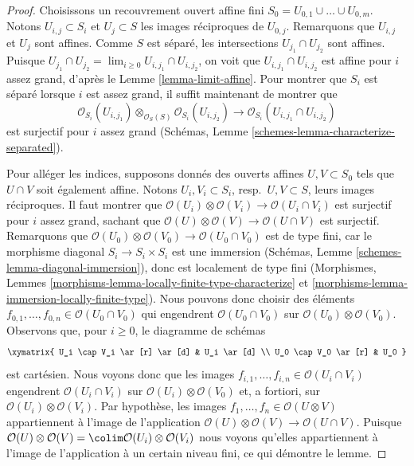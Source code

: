 \begin{proof}
Choisissons un recouvrement ouvert affine fini
$S_0 = U_{0, 1} \cup \ldots \cup U_{0, m}$. Notons
$U_{i, j} \subset S_i$ et $U_j \subset S$ les images réciproques de
$U_{0, j}$. Remarquons que $U_{i, j}$ et $U_j$ sont affines. Comme $S$ est
séparé, les intersections $U_{j_1} \cap U_{j_2}$ sont affines. Puisque
$U_{j_1} \cap U_{j_2} = \lim_{i \geq 0} U_{i, j_1} \cap U_{i, j_2}$,
on voit que $U_{i, j_1} \cap U_{i, j_2}$ est affine pour $i$ assez grand,
d'après le Lemme \ref{lemma-limit-affine}. Pour montrer
que $S_i$ est séparé lorsque $i$ est assez grand, il suffit maintenant de
montrer que
$$
\mathcal{O}_{S_i}(U_{i, j_1})
\otimes_{\mathcal{O}_S(S)}
\mathcal{O}_{S_i}(U_{i, j_2})
\longrightarrow
\mathcal{O}_{S_i}(U_{i, j_1} \cap U_{i, j_2})
$$
est surjectif pour $i$ assez grand (Schémas,
Lemme \ref{schemes-lemma-characterize-separated}).

\medskip\noindent
Pour alléger les indices, supposons donnés des ouverts affines
$U, V \subset S_0$ tels que $U \cap V$ soit également affine. Notons
$U_i, V_i \subset S_i$, resp.\ $U, V \subset S$, leurs images
réciproques. Il faut montrer que
$\mathcal{O}(U_i) \otimes \mathcal{O}(V_i) \to
\mathcal{O}(U_i \cap V_i)$
est surjectif pour $i$ assez grand, sachant que
$\mathcal{O}(U) \otimes \mathcal{O}(V) \to \mathcal{O}(U \cap V)$
est surjectif. Remarquons que
$\mathcal{O}(U_0) \otimes \mathcal{O}(V_0) \to
\mathcal{O}(U_0 \cap V_0)$
est de type fini, car le morphisme diagonal $S_i \to S_i \times S_i$ est une
immersion (Schémas, Lemme \ref{schemes-lemma-diagonal-immersion}), donc est
localement de type fini (Morphismes,
Lemmes \ref{morphisms-lemma-locally-finite-type-characterize} et
\ref{morphisms-lemma-immersion-locally-finite-type}). Nous pouvons donc
choisir des éléments
$f_{0, 1}, \ldots, f_{0, n} \in \mathcal{O}(U_0 \cap V_0)$
qui engendrent $\mathcal{O}(U_0 \cap V_0)$ sur
$\mathcal{O}(U_0) \otimes \mathcal{O}(V_0)$. Observons que, pour $i \geq 0$,
le diagramme de schémas
$$
\xymatrix{
U_i \cap V_i \ar[r] \ar[d] & U_i \ar[d] \\
U_0 \cap V_0 \ar[r] & U_0
}
$$
est cartésien. Nous voyons donc que les images
$f_{i, 1}, \ldots, f_{i, n} \in \mathcal{O}(U_i \cap V_i)$
engendrent $\mathcal{O}(U_i \cap V_i)$ sur
$\mathcal{O}(U_i) \otimes \mathcal{O}(V_0)$ et, a fortiori, sur
$\mathcal{O}(U_i) \otimes \mathcal{O}(V_i)$. Par hypothèse, les images
$f_1, \ldots, f_n \in \mathcal{O}(U \otimes V)$ appartiennent à l'image de
l'application
$\mathcal{O}(U) \otimes \mathcal{O}(V) \to \mathcal{O}(U \cap V)$.
Puisque
$\mathcal{O}(U) \otimes \mathcal{O}(V) =
\colim \mathcal{O}(U_i) \otimes \mathcal{O}(V_i)$
nous voyons qu'elles appartiennent à l'image de l'application à un certain
niveau fini, ce qui démontre le lemme.
\end{proof}


